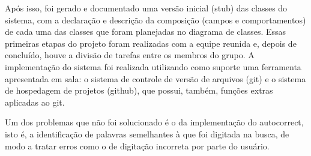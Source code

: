 \documentclass[12pt]{article}
\begin{document}
Após isso, foi gerado e documentado uma versão inicial (stub) das classes do sistema, com a declaração e descrição da composição (campos e comportamentos) de cada uma das  classes que foram planejadas no diagrama de classes. Essas primeiras etapas do projeto foram realizadas com a equipe reunida e, depois de concluído, houve a divisão de tarefas entre os membros do grupo.
A implementação do sistema foi realizada utilizando como suporte uma ferramenta apresentada em sala: o sistema de controle de versão de arquivos (git) e o sistema de hospedagem de projetos (github), que possui, também, funções extras aplicadas ao git.

Um dos problemas que não foi solucionado é o da implementação do autocorrect, isto é, a identificação de palavras semelhantes à que foi digitada na busca, de modo a tratar erros como o de digitação incorreta por parte do usuário.
\end{document}
